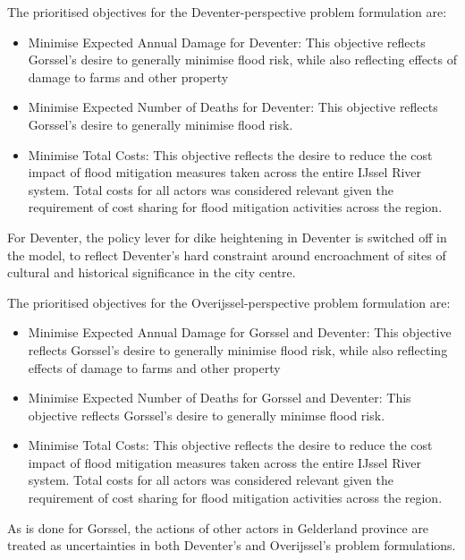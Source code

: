 \smallskip  

The prioritised objectives for the Deventer-perspective problem formulation are:
\begin{itemize}
    \item Minimise Expected Annual Damage for Deventer: This objective reflects Gorssel's desire to generally minimise flood risk, while also reflecting effects of damage to farms and other property
    \item Minimise Expected Number of Deaths for Deventer: This objective reflects Gorssel's desire to generally minimise flood risk.
    \item Minimise Total Costs: This objective reflects the desire to reduce the cost impact of flood mitigation measures taken across the entire IJssel River system. Total costs for all actors was considered relevant given the requirement of cost sharing for flood mitigation activities across the region.
\end{itemize}
For Deventer, the policy lever for dike heightening in Deventer is switched off in the model, to reflect Deventer's hard constraint around encroachment of sites of cultural and historical significance in the city centre.

The prioritised objectives for the Overijssel-perspective problem formulation are:
\begin{itemize}
    \item Minimise Expected Annual Damage for Gorssel and Deventer: This objective reflects Gorssel's desire to generally minimise flood risk, while also reflecting effects of damage to farms and other property
    \item Minimise Expected Number of Deaths for Gorssel and Deventer: This objective reflects Gorssel's desire to generally minimse flood risk.
    \item Minimise Total Costs: This objective reflects the desire to reduce the cost impact of flood mitigation measures taken across the entire IJssel River system. Total costs for all actors was considered relevant given the requirement of cost sharing for flood mitigation activities across the region.
\end{itemize}

As is done for Gorssel, the actions of other actors in Gelderland province are treated as uncertainties in both Deventer's and Overijssel's problem formulations.

